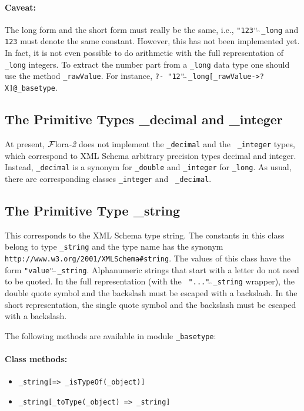 \documentclass[11pt]{article}
\newcommand{\FLORA}{{\mbox{\sc ${\cal F}${lora}\rm\emph{-2}}}\xspace}
\begin{document}
\paragraph{Caveat:} The long form and the short form must really be the
same, i.e., {\tt "123"$\hat{~}\hat{~}$\_long} and {\tt 123} must denote the
same constant.  However, this has not been implemented yet.  In fact, it is
not even possible to do arithmetic with the full representation of {\tt
  \_long} 
integers. To extract the number part from a {\tt \_long}  data type one should use
the method {\tt \_rawValue}.  For instance, {\tt ?-
  "12"$\hat{~}\hat{~}$\_long[\_rawValue->?X]@\_basetype}.



\subsection{ The Primitive Types \_decimal and \_integer}

At present, \FLORA does not implement the {\tt \_decimal} and the {\tt
  \_integer} types, which correspond to XML Schema arbitrary precision
types decimal and integer.  Instead, {\tt \_decimal}  is a synonym for
{\tt \_double} and {\tt \_integer} for {\tt \_long}.   
As usual, there are corresponding classes {\tt \_integer} and {\tt
  \_decimal}. 


\subsection{ The Primitive Type \_string}

This corresponds to the XML Schema type string.  The constants in this
class belong to type {\tt \_string} and the type name has the synonym {\tt
  http://www.w3.org/2001/XMLSchema\#string}.  The values of this class have
the form {\tt "value"$\hat{~}\hat{~}$\_string}.  
Alphanumeric strings that start with a letter do
not need to be quoted. In the full representation (with the {\tt
  "..."$\hat{~}\hat{~}$\_string} wrapper), the double quote symbol and the backslash must
be escaped with a backslash. In the short representation, the single quote
symbol and the backslash must be escaped with a backslash.

The following methods are available in module {\tt \_basetype}:

\paragraph{Class methods:}
\begin{itemize}
\item {\tt \_string[=> \_isTypeOf(\_object)]}  
\item {\tt \_string[\_toType(\_object) => \_string]}  
\end{itemize}
\end{document}

